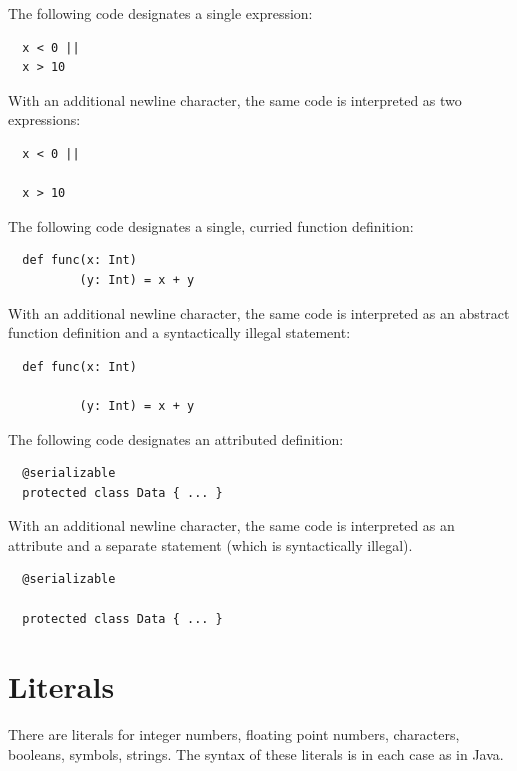 \example The following code designates a single expression:

\begin{lstlisting}
  x < 0 ||
  x > 10
\end{lstlisting}

With an additional newline character, the same code is interpreted as
two expressions:

\begin{lstlisting}
  x < 0 ||

  x > 10
\end{lstlisting}

\example The following code designates a single, curried function definition:

\begin{lstlisting}
  def func(x: Int)
          (y: Int) = x + y
\end{lstlisting}

With an additional newline character, the same code is interpreted as
an abstract function definition and a syntactically illegal statement:

\begin{lstlisting}
  def func(x: Int)

          (y: Int) = x + y
\end{lstlisting}

\example The following code designates an attributed definition:

\begin{lstlisting}
  @serializable
  protected class Data { ... }
\end{lstlisting}

With an additional newline character, the same code is interpreted as
an attribute and a separate statement (which is syntactically
illegal).

\begin{lstlisting}
  @serializable

  protected class Data { ... }
\end{lstlisting}


\section{Literals}\label{sec:literals}

There are literals for integer numbers, floating point numbers,
characters, booleans, symbols, strings.  The syntax of these literals is in
each case as in Java.


